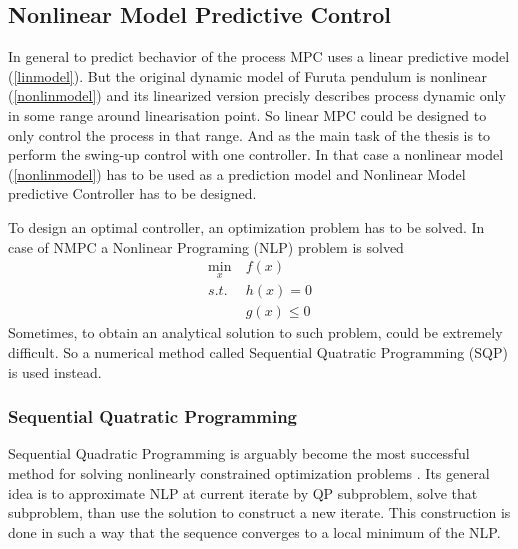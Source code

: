 \subsection{Nonlinear Model Predictive Control}
In general to predict bechavior of the process MPC uses a linear predictive model (\ref{linmodel}). But the original dynamic model of Furuta pendulum is nonlinear (\ref{nonlinmodel}) and its linearized version precisly describes process dynamic only in some range around linearisation point. So linear MPC could be designed to only control the process in that range. And as the main task of the thesis is to perform the swing-up control with one controller. In that case a nonlinear model (\ref{nonlinmodel}) has to be used as a prediction model and Nonlinear Model predictive Controller has to be designed.

To design an optimal controller, an optimization problem has to be solved. In case of NMPC a Nonlinear Programing (NLP) problem is solved
\begin{subequations}\label{nlpgeneral}
	\begin{align}
	\min_{x}\  &f(x)\\
	s.t.\  &h(x) = 0\\
		 &g(x)\leq 0
	\end{align}
\end{subequations}
Sometimes, to obtain an analytical solution to such problem, could be extremely difficult. So a numerical method called Sequential Quatratic Programming (SQP) is used instead.
\subsubsection{Sequential Quatratic Programming}
Sequential Quadratic Programming is arguably become the most successful method for solving nonlinearly constrained optimization problems \cite{SQP:Theory}. Its general idea is to approximate NLP at current iterate by QP subproblem, solve that subproblem, than use the solution to construct a new iterate. This construction is done in such a way that the sequence converges to a local minimum of the NLP.

